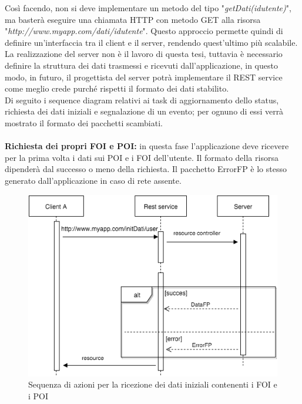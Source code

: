 Così facendo, non si deve implementare un metodo del tipo "\textit{getDati(idutente)}", ma basterà eseguire una chiamata HTTP con metodo GET alla risorsa \\
"\textit{http://www.myapp.com/dati/idutente}". Questo approccio permette quindi di definire un'interfaccia tra il client e il server, rendendo quest'ultimo più scalabile. \\
La realizzazione del server non è il lavoro di questa tesi, tuttavia è necessario definire la struttura dei dati trasmessi e ricevuti dall'applicazione, in questo modo, in futuro, il progettista del server potrà implementare il REST service come meglio crede purché rispetti il formato dei dati stabilito. \\
Di seguito i sequence diagram relativi ai task di aggiornamento dello status, richiesta dei dati iniziali e segnalazione di un evento; per ognuno di essi verrà mostrato il formato dei pacchetti scambiati.\\\\
 \textbf{Richiesta dei propri FOI e POI:} in questa fase l'applicazione deve ricevere per la prima volta i dati sui POI e i FOI dell'utente. Il formato della risorsa dipenderà dal successo o meno della richiesta. Il pacchetto ErrorFP è lo stesso generato dall'applicazione in caso di rete assente. \\
 \begin{figure}[H]
	\centering
	\includegraphics[scale=0.7]{Implementazione/foipois.png}
	\caption{Sequenza di azioni per la ricezione dei dati iniziali contenenti i FOI e i POI}
	\label{fig:rest}
\end{figure}
